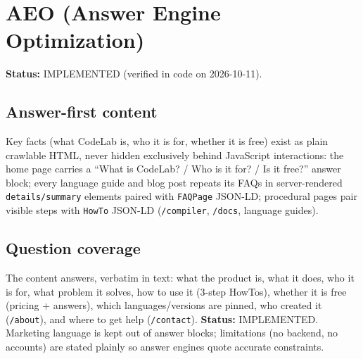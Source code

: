 \section{AEO (Answer Engine Optimization)}
\label{sec:aeo}

\textbf{Status:} IMPLEMENTED (verified in code on 2026-10-11).

\subsection{Answer-first content}
Key facts (what CodeLab is, who it is for, whether it is free) exist as plain crawlable HTML, never hidden exclusively behind JavaScript interactions: the home page carries a ``What is CodeLab? / Who is it for? / Is it free?'' answer block; every language guide and blog post repeats its FAQs in server-rendered \texttt{details/summary} elements paired with \texttt{FAQPage} JSON-LD; procedural pages pair visible steps with \texttt{HowTo} JSON-LD (\texttt{/compiler}, \texttt{/docs}, language guides).

\subsection{Question coverage}
The content answers, verbatim in text: what the product is, what it does, who it is for, what problem it solves, how to use it (3-step HowTos), whether it is free (pricing + answers), which languages/versions are pinned, who created it (\texttt{/about}), and where to get help (\texttt{/contact}). \textbf{Status:} IMPLEMENTED. Marketing language is kept out of answer blocks; limitations (no backend, no accounts) are stated plainly so answer engines quote accurate constraints.
